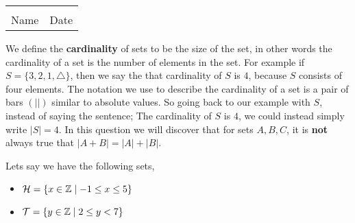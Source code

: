 \documentclass[12pt]{article} %
\begin{document}
	\begin{center}
	\noindent\begin{tabular}{ll}
		\makebox[3in]{\hrulefill} & \makebox[3in]{\hrulefill}\\
		Name & Date\\[8ex]%
	\end{tabular}
	\end{center}
	\newpage



\begin{qstn}
  We define the \textbf{cardinality} of sets to be the size of the set, in other words the cardinality of a set is the number of
  elements in the set. For example if $S = \{3,2,1,\triangle \} $, then we say the that cardinality of $S$ is $4$, because  $S$ 
  consists of four elements. The notation we use to describe the cardinality of a set is a pair of bars $(\left|\right|)$ similar to absolute
  values. So going back to our example with  $S$, instead of saying the sentence; The cardinality of  $S$ is $4$, we could
  instead simply write $\left|S\right| = 4$. In this question we will discover that for sets $A,B,C$, it is \textbf{not} always
  true that $\left|A + B\right| = \left|A\right| + \left|B\right|$.

  Lets say we have the following sets,
  \begin{itemize}
    \item $\mathcal{H} = \{x\in \mathbb Z \mid -1 \leq x \leq 5\} $
    \item $\mathcal{T} = \{y\in \mathbb Z \mid  2 \leq y < 7\} $
  \end{itemize}
  


\end{qstn}
\end{document}
